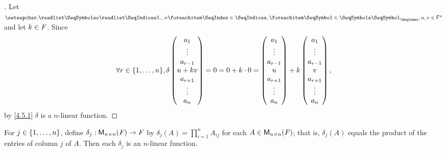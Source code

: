\begin{proof}[]
  Let \(\seq{a}{1,,n}, u, v \in \vs{F}^n\) and let \(k \in \mathit{F}\).
  Since
  \[
    \forall r \in \set{1, \dots, n}, \delta\begin{pmatrix}
      a_1       \\
      \vdots    \\
      a_{r - 1} \\
      u + kv    \\
      a_{r + 1} \\
      \vdots    \\
      a_n
    \end{pmatrix} = 0 = 0 + k \cdot 0 = \begin{pmatrix}
      a_1       \\
      \vdots    \\
      a_{r - 1} \\
      u         \\
      a_{r + 1} \\
      \vdots    \\
      a_n
    \end{pmatrix} + k \begin{pmatrix}
      a_1       \\
      \vdots    \\
      a_{r - 1} \\
      v         \\
      a_{r + 1} \\
      \vdots    \\
      a_n
    \end{pmatrix},
  \]
  by \cref{4.5.1} \(\delta\) is a \(n\)-linear function.
\end{proof}

\begin{eg}\label{4.5.3}
  For \(j \in \left\lbrace1, \dots, n\right\rbrace\), define \(\delta_j : \mathsf{M}_{{n} \times n}({\mathit{F}}) \to \mathit{F}\) by \(\delta_j(A) = \prod_{i = 1}^n A_{i j}\) for each \(A \in \mathsf{M}_{{n} \times n}({\mathit{F}})\);
  that is, \(\delta_j(A)\) equals the product of the entries of column \(j\) of \(A\).
  Then each \(\delta_j\) is an \(n\)-linear function.
\end{eg}

